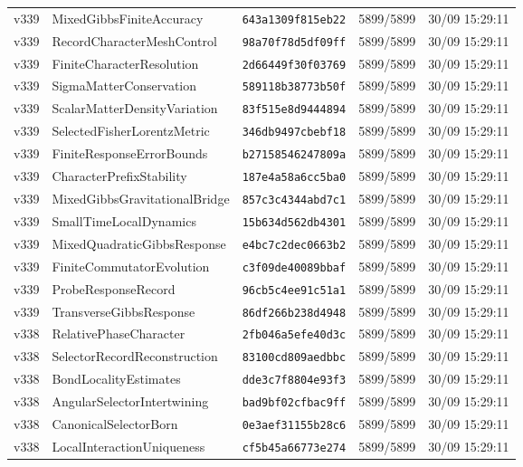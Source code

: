 \documentclass[11pt]{article}
\theoremstyle{definition}\newtheorem{deriv}{Derivação}
\begin{document}
{\begin{longtable}{@{}lllll@{}}
v339 & MixedGibbsFiniteAccuracy & \texttt{643a1309f815eb22} & 5899/5899 & 30/09 15:29:11 \\
v339 & RecordCharacterMeshControl & \texttt{98a70f78d5df09ff} & 5899/5899 & 30/09 15:29:11 \\
v339 & FiniteCharacterResolution & \texttt{2d66449f30f03769} & 5899/5899 & 30/09 15:29:11 \\
v339 & SigmaMatterConservation & \texttt{589118b38773b50f} & 5899/5899 & 30/09 15:29:11 \\
v339 & ScalarMatterDensityVariation & \texttt{83f515e8d9444894} & 5899/5899 & 30/09 15:29:11 \\
v339 & SelectedFisherLorentzMetric & \texttt{346db9497cbebf18} & 5899/5899 & 30/09 15:29:11 \\
v339 & FiniteResponseErrorBounds & \texttt{b27158546247809a} & 5899/5899 & 30/09 15:29:11 \\
v339 & CharacterPrefixStability & \texttt{187e4a58a6cc5ba0} & 5899/5899 & 30/09 15:29:11 \\
v339 & MixedGibbsGravitationalBridge & \texttt{857c3c4344abd7c1} & 5899/5899 & 30/09 15:29:11 \\
v339 & SmallTimeLocalDynamics & \texttt{15b634d562db4301} & 5899/5899 & 30/09 15:29:11 \\
v339 & MixedQuadraticGibbsResponse & \texttt{e4bc7c2dec0663b2} & 5899/5899 & 30/09 15:29:11 \\
v339 & FiniteCommutatorEvolution & \texttt{c3f09de40089bbaf} & 5899/5899 & 30/09 15:29:11 \\
v339 & ProbeResponseRecord & \texttt{96cb5c4ee91c51a1} & 5899/5899 & 30/09 15:29:11 \\
v339 & TransverseGibbsResponse & \texttt{86df266b238d4948} & 5899/5899 & 30/09 15:29:11 \\
v338 & RelativePhaseCharacter & \texttt{2fb046a5efe40d3c} & 5899/5899 & 30/09 15:29:11 \\
v338 & SelectorRecordReconstruction & \texttt{83100cd809aedbbc} & 5899/5899 & 30/09 15:29:11 \\
v338 & BondLocalityEstimates & \texttt{dde3c7f8804e93f3} & 5899/5899 & 30/09 15:29:11 \\
v338 & AngularSelectorIntertwining & \texttt{bad9bf02cfbac9ff} & 5899/5899 & 30/09 15:29:11 \\
v338 & CanonicalSelectorBorn & \texttt{0e3aef31155b28c6} & 5899/5899 & 30/09 15:29:11 \\
v338 & LocalInteractionUniqueness & \texttt{cf5b45a66773e274} & 5899/5899 & 30/09 15:29:11 \\

\end{longtable}}
\end{document}
